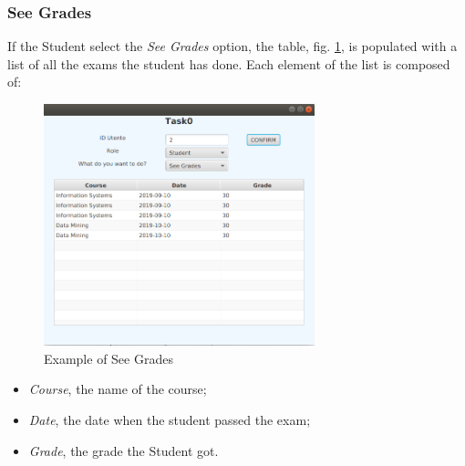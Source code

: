 \documentclass{report}
\begin{document}
\subsubsection*{See Grades}
If the Student select the \textit{See Grades} option, the table, fig. \ref{fig:SeeGrades}, is populated with a list of all the exams the student has done. Each element of the list is composed of:
\begin{figure} [h!]
	\centering
	\includegraphics[width=0.7\textwidth]{SeeGrades.png}
	\caption{Example of See Grades}
	\label{fig:SeeGrades}
\end{figure}
\begin{itemize}
	\item \textit{Course}, the name of the course;
	\item \textit{Date}, the date when the student passed the exam;
	\item \textit{Grade}, the grade the Student got. 
\end{itemize}

\newpage
\end{document}
